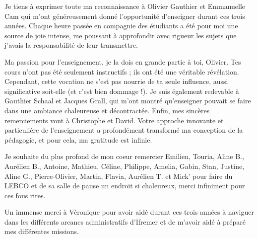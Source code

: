 \begin{refsection}
Je tiens à exprimer toute ma reconnaissance à Olivier Gauthier et
Emmanuelle Cam qui m'ont généreusement donné l'opportunité d'enseigner
durant ces trois années. Chaque heure passée en compagnie des étudiants
a été pour moi une source de joie intense, me poussant à approfondir
avec rigueur les sujets que j'avais la responsabilité de leur
transmettre.

Ma passion pour l'enseignement, je la dois en grande partie à toi,
Olivier. Tes cours n'ont pas été seulement instructifs ; ils ont été une
véritable révélation. Cependant, cette vocation ne s'est pas nourrie de
ta seule influence, aussi significative soit-elle (et c'est bien dommage
!). Je suis également redevable à Gauthier Schaal et Jacques Grall, qui
m'ont montré qu'enseigner pouvait se faire dans une ambiance chaleureuse
et décontractée. Enfin, mes sincères remerciements vont à Christophe et
David. Votre approche innovante et particulière de l'enseignement a
profondément transformé ma conception de la pédagogie, et pour cela, ma
gratitude est infinie.

Je souhaite du plus profond de mon coeur remercier Emilien, Touria,
Aline B., Aurélien B., Antoine, Mathieu, Céline, Philippe, Amelia,
Gabin, Stan, Justine, Aline G., Pierre-Olivier, Martin, Flavia, Aurélien
T. et Mick' pour faire du LEBCO et de sa salle de pause un endroit si
chaleureux, merci infiniment pour ces fous rires.

Un immense merci à Véronique pour avoir aidé durant ces trois années à
naviguer dans les différents arcanes administratifs d'Ifremer et de
m'avoir aidé à préparé mes différentes missions.


\end{refsection}
